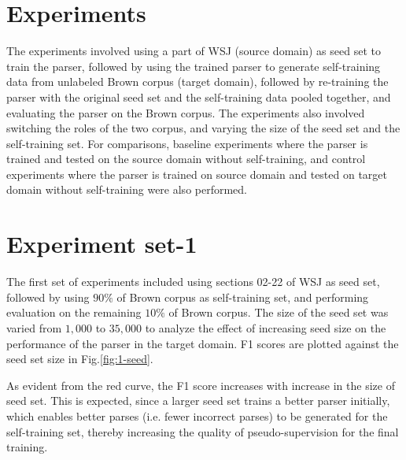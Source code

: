 \documentclass{sig-alternate-05-2015}
\begin{document}
\section{Experiments}
The experiments involved using a part of WSJ (source domain) as seed set to train the parser, followed by using the trained parser to generate self-training data from unlabeled Brown corpus (target domain), followed by re-training the parser with the original seed set and the self-training data pooled together, and evaluating the parser on the Brown corpus. The experiments also involved switching the roles of the two corpus, and varying the size of the seed set and the self-training set. For comparisons, baseline experiments where the parser is trained and tested on the source domain without self-training, and control experiments where the parser is trained on source domain and tested on target domain without self-training were also performed.

\section{Experiment set-1}
The first set of experiments included using sections 02-22 of WSJ as seed set, followed by using $90\%$ of Brown corpus as self-training set, and performing evaluation on the remaining $10\%$ of Brown corpus. The size of the seed set was varied from $1,000$ to $35,000$ to analyze the effect of increasing seed size on the performance of the parser in the target domain. F1 scores are plotted against the seed set size in Fig.\ref{fig:1-seed}. 

As evident from the red curve, the F1 score increases with increase in the size of seed set. This is expected, since a larger seed set trains a better parser initially, which enables better parses (i.e. fewer incorrect parses) to be generated for the self-training set, thereby increasing the quality of pseudo-supervision for the final training.
\end{document}
